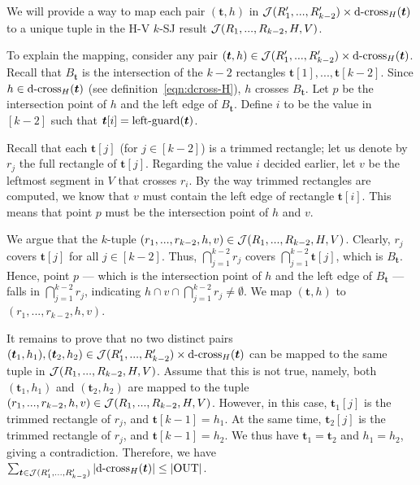 \vgap 

We will provide a way to map each pair $(\bm{t},h)$ in $\mathcal{J}(R_1',...,R_{k-2}')\times \mathrm{d\text{-}cross}_H(\textrm{\boldmath${t}$})$ to a unique tuple in the H-V $k$-SJ result $\mathcal{J}(R_1,...,R_{k-2},H,V)$.

\vgap 

To explain the mapping, consider any pair $(\textrm{\boldmath${t}$},h) \in \mathcal{J}(R_1',...,R_{k-2}')\times \mathrm{d\text{-}cross}_H(\textrm{\boldmath${t}$})$. Recall that $B_\bm{t}$ is the intersection of the $k-2$ rectangles $\bm{t}[1], ..., \bm{t}[k-2]$. Since $h \in \mathrm{d\text{-}cross}_H(\textrm{\boldmath${t}$})$ (see definition~\eqref{eqn:dcross-H}), $h$ crosses $B_\bm{t}$. Let $p$ be the intersection point of $h$ and the left edge of $B_\bm{t}$. Define $i$ to be the value in $[k-2]$ such that $\textrm{\boldmath${t}$}[i] = \mathrm{left\text{-}guard}(\textrm{\boldmath${t}$})$. 

\vgap

Recall that each $\bm{t}[j]$ (for $j \in [k-2]$) is a trimmed rectangle; let us denote by $r_j$ the full rectangle of $\bm{t}[j]$. Regarding the value $i$ decided earlier, let $v$ be the leftmost segment in $V$ that crosses $r_i$. By the way trimmed rectangles are computed, we know that $v$ must contain the left edge of rectangle $\bm{t}[i]$. This means that point $p$ must be the intersection point of $h$ and $v$.

\vgap 

We argue that the $k$-tuple $(r_1, ..., r_{k-2}, h, v)\in \mathcal{J}(R_1,..., R_{k-2},H,V)$. Clearly, $r_j$ covers $\bm{t}[j]$ for all $j \in [k-2]$. Thus, $\bigcap_{j=1}^{k-2} r_j$ covers $\bigcap_{j=1}^{k-2} \bm{t}[j]$, which is $B_\bm{t}$. Hence, point $p$ --- which is the intersection point of $h$ and the left edge of $B_\bm{t}$ --- falls in $\bigcap_{j=1}^{k-2} r_j$, indicating $h \cap v \cap \bigcap_{j=1}^{k-2} r_j \ne \emptyset$. We map $(\bm{t},h)$ to $(r_1, ..., r_{k-2}, h, v)$.

\vgap

It remains to prove that no two distinct pairs $(\textrm{\boldmath${t}$}_1, h_1), (\textrm{\boldmath${t}$}_2, h_2) \in \mathcal{J}(R_1',...,R_{k-2}')\times \mathrm{d\text{-}cross}_H(\textrm{\boldmath${t}$})$ can be mapped to the same tuple in $\mathcal{J}(R_1,..., R_{k-2},H,V)$. Assume that this is not true, namely, both $(\bm{t}_1, h_1)$ and $(\bm{t}_2, h_2)$ are mapped to the tuple $(r_1, ..., r_{k-2}, h, v) \in \mathcal{J}(R_1,..., R_{k-2}, H, V)$. However, in this case, $\bm{t}_1[j]$ is the trimmed rectangle of $r_j$, and $\bm{t}[k-1] = h_1$. At the same time, $\bm{t}_2[j]$ is the trimmed rectangle of $r_j$, and $\bm{t}[k-1] = h_2$. We thus have $\bm{t}_1 = \bm{t}_2$ and $h_1 = h_2$, giving a contradiction. Therefore, we have $\sum_{\textrm{\boldmath${t}$}\in \mathcal{J}(R_1',...,R_{k-2}')}  |\mathrm{d\text{-}cross}_H(\textrm{\boldmath${t}$})| \leq |\mathrm{OUT}|$.

